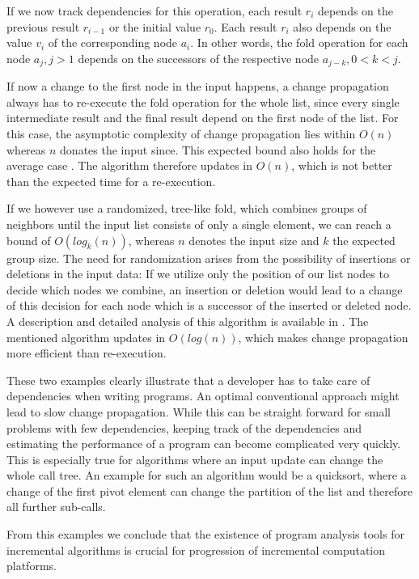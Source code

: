 If we now track dependencies for this operation, each result $r_i$ depends on the previous result $r_{i - 1}$ or the initial value $r_0$. Each result $r_i$ also depends on the value $v_i$ of the corresponding node $a_i$. In other words, the fold operation for each node $a_j, j > 1$ depends on the successors of the respective node $a_{j - k}, 0 < k < j$.

If now a change to the first node in the input happens, a change propagation always has to re-execute the fold operation for the whole list, since every single intermediate result and the final result depend on the first node of the list. For this case, the asymptotic complexity of change propagation lies within $O(n)$ whereas $n$ donates the input since. This expected bound also holds for the average case \cite{Acar2005thesis}. The algorithm therefore updates in $O(n)$, which is not better than the expected time for a re-execution. 

If we however use a randomized, tree-like fold, which combines groups of neighbors until the input list consists of only a single element, we can reach a bound of $O(log_k(n))$, whereas $n$ denotes the input size and $k$ the expected group size. 
The need for randomization arises from the possibility of insertions or deletions in the input data: If we utilize only the position of our list nodes to decide which nodes we combine, an insertion or deletion would lead to a change of this decision for each node which is a successor of the inserted or deleted node. A description and detailed analysis of this algorithm is available in \cite{Acar2005thesis}. The mentioned algorithm updates in $O(log(n))$, which makes change propagation more efficient than re-execution. 

These two examples clearly illustrate that a developer has to take care of dependencies when writing programs. An optimal conventional approach might lead to slow change propagation. While this can be straight forward for small problems with few dependencies, keeping track of the dependencies and estimating the performance of a program can become complicated very quickly. This is especially true for algorithms where an input update can change the whole call tree. An example for such an algorithm would be a quicksort\cite{hoare1962quicksort}, where a change of the first pivot element can change the partition of the list and therefore all further sub-calls. 

From this examples we conclude that the existence of program analysis tools for incremental algorithms is crucial for progression of incremental computation platforms. 


